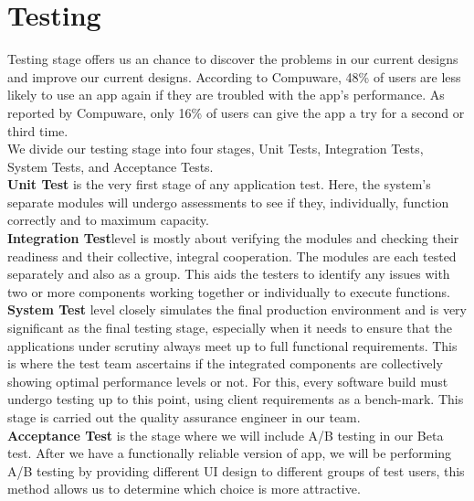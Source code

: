 \section{Testing}
Testing stage offers us an chance to discover the problems in our current designs and improve our current designs. 
According to Compuware, 48\% of users are less likely to use an app again if they are troubled with the app’s performance.
As reported by Compuware, only 16\% of users can give the app a try for a second or third time. 
\\
We divide our testing stage into four stages, Unit Tests, Integration Tests, System Tests, and Acceptance Tests.
\\\textbf{Unit Test} is the very first stage of any application test. Here, the system’s separate modules will undergo assessments to see if they, individually, function correctly and to maximum capacity. 
\\\textbf{Integration Test}level is mostly about verifying the modules and checking their readiness and their collective, integral cooperation. The modules are each tested separately and also as a group. This aids the testers to identify any issues with two or more components working together or individually to execute functions.
\\\textbf{System Test} level closely simulates the final production environment and is very significant as the final testing stage, especially when it needs to ensure that the applications under scrutiny always meet up to full functional requirements. 
This is where the test team ascertains if the integrated components are collectively showing optimal performance levels or not. For this, every software build must undergo testing up to this point, using client requirements as a bench-mark. 
This stage is carried out the quality assurance engineer in our team.
\\\textbf{Acceptance Test} is the stage where we will include A/B testing in our Beta test. After we have a functionally reliable version of app, 
we will be performing A/B testing by providing different UI design to different groups of test users, this method allows us to 
determine which choice is more attractive.



